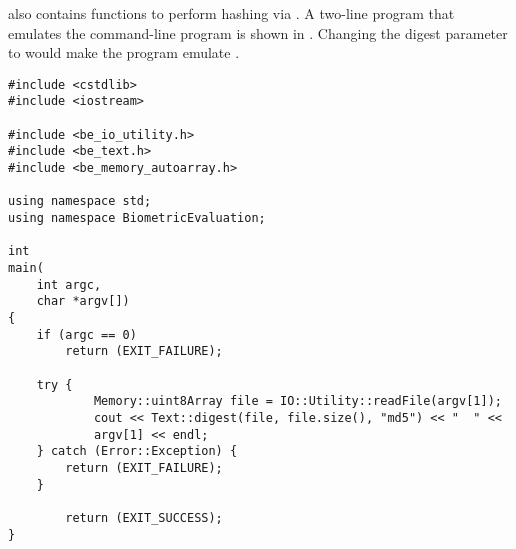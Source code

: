 also contains functions to perform  hashing via .
A two-line program that emulates the command-line  program is
shown in .  Changing the digest parameter to
 would make the program emulate .

\begin{lstlisting}[caption={\code{md5sum} via \sname}, label=lst:text-digest]
#include <cstdlib>
#include <iostream>

#include <be_io_utility.h>
#include <be_text.h>
#include <be_memory_autoarray.h>

using namespace std;
using namespace BiometricEvaluation;

int
main(
    int argc,
    char *argv[])
{
	if (argc == 0)
		return (EXIT_FAILURE);
	
	try {
	        Memory::uint8Array file = IO::Utility::readFile(argv[1]);
	        cout << Text::digest(file, file.size(), "md5") << "  " <<
		    argv[1] << endl;
	} catch (Error::Exception) {
		return (EXIT_FAILURE);
	}

        return (EXIT_SUCCESS);
}
\end{lstlisting}

